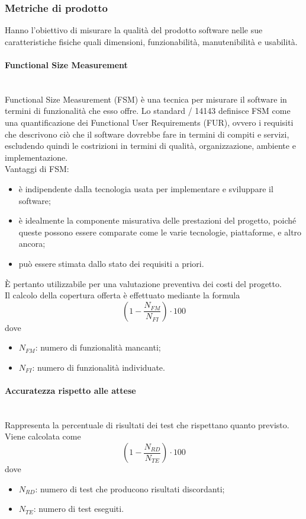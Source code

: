 \subsubsection{Metriche di prodotto}
Hanno l'obiettivo di misurare la qualità del prodotto software nelle sue caratteristiche fisiche quali dimensioni, funzionabilità, manutenibilità e usabilità.

\paragraph{Functional Size Measurement}\mbox{}\\
Functional Size Measurement (FSM) è una tecnica per misurare il software in termini di funzionalità che esso offre. Lo standard / 14143 definisce FSM come una quantificazione dei Functional User Requirements (FUR), ovvero i requisiti che descrivono ciò che il software dovrebbe fare in termini di compiti e servizi, escludendo quindi le costrizioni in termini di qualità, organizzazione, ambiente e implementazione.\\
Vantaggi di FSM:
\begin{itemize}
 	\item è indipendente dalla tecnologia usata per implementare e sviluppare il software;
 	\item è idealmente la componente misurativa delle prestazioni del progetto, poiché queste possono essere comparate come le varie tecnologie, piattaforme, e altro ancora;
 	\item può essere stimata dallo stato dei requisiti a priori.
\end{itemize}
\`{E} pertanto utilizzabile per una valutazione preventiva dei costi del progetto.\\
Il calcolo della copertura offerta è effettuato mediante la formula
\[ \left(1 - \frac{N_{FM}}{N_{FI}} \right) \cdot 100 \]
dove
\begin{itemize}
	\item $N_{FM}$: numero di funzionalità mancanti;
	\item $N_{FI}$: numero di funzionalità individuate. 
\end{itemize}

\paragraph{Accuratezza rispetto alle attese}\mbox{}\\
Rappresenta la percentuale di risultati dei test che rispettano quanto previsto. Viene calcolata come
\[ \left(1 - \frac{N_{RD}}{N_{TE}} \right) \cdot 100 \]
dove
\begin{itemize}
	\item $N_{RD}$: numero di test che producono risultati discordanti;
	\item $N_{TE}$: numero di test eseguiti.
\end{itemize}

